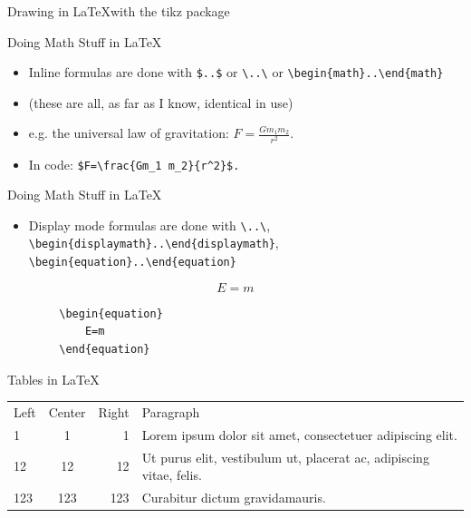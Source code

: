 \documentclass{beamer}
\begin{document}
\begin{frame}{Drawing in \LaTeX with the tikz package}
\end{frame}	

\begin{frame}[fragile]{Doing Math Stuff in \LaTeX}
	\begin{itemize}
		\item Inline formulas are done with \verb|$..$| or \verb|\..\| or \verb|\begin{math}..\end{math}|
		\item (these are all, as far as I know, identical in use)
		\pause
		\item e.g. the universal law of gravitation: $F=\frac{Gm_1 m_2}{r^2}$.
		\pause
		\item In code: \verb|$F=\frac{Gm_1 m_2}{r^2}$.|
	\end{itemize}
\end{frame}

\begin{frame}[fragile]{Doing Math Stuff in \LaTeX}
	\begin{itemize}
		\item Display mode formulas are done with \verb|\..\|, \verb|\begin{displaymath}..\end{displaymath}|, \verb|\begin{equation}..\end{equation}|
\end{itemize}
\end{frame}
	
\begin{frame}[fragile]
	\begin{equation}
		E=m
	\end{equation}
	\pause
	\begin{Verbatim}
		\begin{equation}
			E=m
		\end{equation}
	\end{Verbatim}
\end{frame}

\begin{frame}{Tables in \LaTeX}
	\begin{tabular}{||l|c|r|p{6cm}||}
		Left & Center & Right & Paragraph \\
		1 & 1 & 1 & Lorem ipsum dolor sit amet, consectetuer adipiscing elit. \\
		12 & 12 & 12 & Ut purus elit, vestibulum ut, placerat ac, adipiscing vitae, felis. \\
		123 & 123 & 123 & Curabitur dictum gravidamauris. \\
	\end{tabular}
\end{frame}
\end{document}
